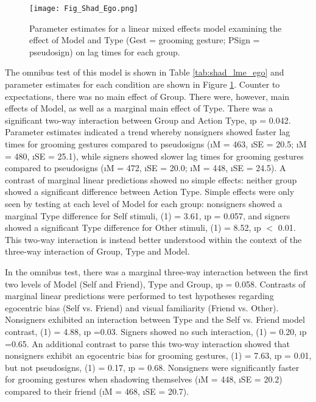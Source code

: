  

            \begin{figure}[!h] \centering 
                \texttt{[image: Fig\_Shad\_Ego.png]} 
                \caption[Parameter estimates: Shadowing, effect of Model]{Parameter estimates for a linear mixed effects model examining the effect of Model and Type (Gest = grooming gesture; PSign = pseudosign) on lag times for each group.} \label{fig:shad_ego}
            \end{figure}
            The omnibus test of this model is shown in Table \ref{tab:shad_lme_ego} and parameter estimates for each condition are shown in Figure \ref{fig:shad_ego}. Counter to expectations, there was no main effect of Group. There were, however, main effects of Model, as well as a marginal main effect of Type. There was a significant two-way interaction between Group and Action Type, \i{p} = 0.042. Parameter estimates indicated a trend whereby nonsigners showed faster lag times for grooming gestures compared to pseudosigns (\i{M} = 463, \i{SE} = 20.5; \i{M} = 480, \i{SE} = 25.1), while signers showed slower lag times for grooming gestures compared to pseudosigns (\i{M} = 472, \i{SE} = 20.0; \i{M} = 448, \i{SE} = 24.5). A contrast of marginal linear predictions showed no simple effects: neither group showed a significant difference between Action Type. Simple effects were only seen by testing at each level of Model for each group: nonsigners showed a marginal Type difference for Self stimuli, \chsq(1) = 3.61, \i{p} = 0.057, and signers showed a significant Type difference for Other stimuli, \chsq(1) = 8.52, \i{p} $<$ 0.01. This two-way interaction is instead better understood within the context of the three-way interaction of Group, Type and Model. \par
            In the omnibus test, there was a marginal three-way interaction between the first two levels of Model (Self and Friend), Type and Group, \i{p} = 0.058. Contrasts of marginal linear predictions were performed to test hypotheses regarding egocentric bias (Self vs. Friend) and visual familiarity (Friend vs. Other). Nonsigners exhibited an interaction between Type and the Self vs. Friend model contrast, \chsq(1) =  4.88, \i{p} =0.03. Signers showed no such interaction, \chsq(1) =  0.20, \i{p} =0.65. An additional contrast to parse this two-way interaction showed that nonsigners exhibit an egocentric bias for grooming gestures, \chsq(1) = 7.63, \i{p} = 0.01, but not pseudosigns, \chsq(1) = 0.17, \i{p} = 0.68. Nonsigners were significantly faster for grooming gestures when shadowing themselves (\i{M} = 448, \i{SE} = 20.2) compared to their friend (\i{M} = 468, \i{SE} = 20.7).\par
